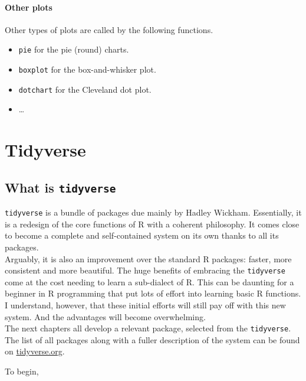 \documentclass[]{book}
\providecommand{\tightlist}{%
  \setlength{\itemsep}{0pt}\setlength{\parskip}{0pt}}
\theoremstyle{definition}
\theoremstyle{definition}
\theoremstyle{definition}
\theoremstyle{remark}
\begin{document}
\hypertarget{other-plots}{%
\subsection{Other plots}\label{other-plots}}

Other types of plots are called by the following functions.

\begin{itemize}
\tightlist
\item
  \texttt{pie} for the pie (round) charts.
\item
  \texttt{boxplot} for the box-and-whisker plot.
\item
  \texttt{dotchart} for the Cleveland dot plot.
\item
  \ldots{}
\end{itemize}

\hypertarget{part-tidyverse}{%
\part{Tidyverse}\label{part-tidyverse}}

\hypertarget{tidyverse}{%
\chapter{\texorpdfstring{What is
\texttt{tidyverse}}{What is tidyverse}}\label{tidyverse}}

\texttt{tidyverse} is a bundle of packages due mainly by Hadley Wickham.
Essentially, it is a redesign of the core functions of R with a coherent
philosophy. It comes close to become a complete and self-contained
system on its own thanks to all its packages.\\
Arguably, it is also an improvement over the standard R packages:
faster, more consistent and more beautiful. The huge benefits of
embracing the \texttt{tidyverse} come at the cost needing to learn a
sub-dialect of R. This can be daunting for a beginner in R programming
that put lots of effort into learning basic R functions.\\
I understand, however, that these initial efforts will still pay off
with this new system. And the advantages will become overwhelming.\\
The next chapters all develop a relevant package, selected from the
\texttt{tidyverse}. The list of all packages along with a fuller
description of the system can be found on
\href{https://www.tidyverse.org/}{tidyverse.org}.

To begin,
\end{document}
